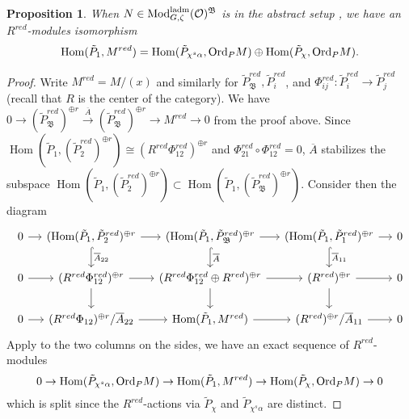 \documentclass[leqno]{amsart}
\newcommand{\laMod}{\textnormal{Mod}^{\textnormal{ladm}}}
\newcommand{\Ord}{\textnormal{Ord}}
\newcommand{\oo}{\mathcal O}
\newcommand{\1}{\mathbf{1}}
\newcommand{\B}{\mathfrak B}
\DeclareMathOperator{\Hom}{Hom}
\newtheorem{prop}[thm]{Proposition}
\theoremstyle{definition}
\theoremstyle{remark}
\begin{document}
\begin{prop}
    When $N\in  \laMod_{G,\zeta}(\oo)^\B$ is in the abstract setup , we have an $R^{red}$-modules isomorphism
    \begin{equation*}
        \Hom(\tilde{P}_1,M^{red})=\Hom(\tilde{P}_{\chi^s\alpha}, \Ord_PM)\oplus \Hom(\tilde{P}_\chi,\Ord_PM).
    \end{equation*}
\end{prop}
\begin{proof}
Write $M^{red}=M/(x)$ and similarly for $\tilde{P}_\B^{red}, \tilde{P}_i^{red}$, and $\Phi_{ij}^{red}\colon \tilde{P}_i^{red}\to \tilde{P}_j^{red}$ (recall that $R$ is the center of the category).
We have $0\to (\tilde{P}_\B^{red})^{\oplus r}\xrightarrow{\overline{A}}(\tilde{P}_\B^{red})^{\oplus r}\to M^{red}\to 0$ from the proof above.
Since $\Hom(\tilde{P}_1,(\tilde{P}_2^{red})^{\oplus r})\cong (R^{red} \Phi_{12}^{red})^{\oplus r}$ and $\Phi_{21}^{red}\circ \Phi_{12}^{red}=0$,
$\overline{A}$ stabilizes the subspace $\Hom(\tilde{P}_1,(\tilde{P}_2^{red})^{\oplus r})\subset \Hom(\tilde{P}_1,(\tilde{P}_\B^{red})^{\oplus r})$.
Consider then the diagram
\begin{equation*}
    \begin{tikzcd}[column sep=small]
        0 \arrow[r] & (\Hom(\tilde{P}_1,\tilde{P}_2^{red})^{\oplus r} \arrow[d,"\overline{A}_{22}",hookrightarrow] \arrow[r] & (\Hom(\tilde{P}_1,\tilde{P}_\B^{red})^{\oplus r} \arrow[d,"\overline{A}",hookrightarrow] \arrow[r] & (\Hom(\tilde{P}_1,\tilde{P}_1^{red})^{\oplus r} \arrow[d,"\overline{A}_{11}",hookrightarrow] \arrow[r] & 0 \\ 
        0 \arrow[r] &(R^{red}\Phi_{12}^{red})^{\oplus r} \arrow[d] \arrow[r] & (R^{red}\Phi_{12}^{red}\oplus R^{red})^{\oplus r} \arrow[d] \arrow[r] & (R^{red})^{\oplus r}\arrow[d] \arrow[r] & 0 \\ 
        0 \arrow[r] & (R^{red} \Phi_{12})^{\oplus r}/\overline{A}_{22}  \arrow[r] & \Hom(\tilde{P}_1,M^{red}) \arrow[r] & (R^{red})^{\oplus r}/\overline{A}_{11}\arrow[r] & 0 
    \end{tikzcd}
\end{equation*}
Apply  to the two columns on the sides,  we have an exact sequence of $R^{red}$-modules
\begin{equation*}
    0\to \Hom(\tilde{P}_{\chi^s\alpha}, \Ord_PM)\to \Hom(\tilde{P}_1,M^{red})\to \Hom(\tilde{P}_\chi,\Ord_PM)\to 0
\end{equation*}
which is split since the $R^{red}$-actions via $\tilde{P}_\chi$ and $\tilde{P}_{\chi^s\alpha}$ are distinct.
\end{proof}



\end{document}
